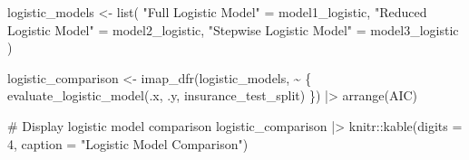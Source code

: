 \documentclass[
  11pt]{article}
\newenvironment{Shaded}{\begin{snugshade}}{\end{snugshade}}
\newcommand{\AttributeTok}[1]{\textcolor[rgb]{0.40,0.45,0.13}{#1}}
\newcommand{\CommentTok}[1]{\textcolor[rgb]{0.37,0.37,0.37}{#1}}
\newcommand{\DecValTok}[1]{\textcolor[rgb]{0.68,0.00,0.00}{#1}}
\newcommand{\FunctionTok}[1]{\textcolor[rgb]{0.28,0.35,0.67}{#1}}
\newcommand{\NormalTok}[1]{\textcolor[rgb]{0.00,0.23,0.31}{#1}}
\newcommand{\OtherTok}[1]{\textcolor[rgb]{0.00,0.23,0.31}{#1}}
\newcommand{\SpecialCharTok}[1]{\textcolor[rgb]{0.37,0.37,0.37}{#1}}
\newcommand{\StringTok}[1]{\textcolor[rgb]{0.13,0.47,0.30}{#1}}
\begin{document}
\begin{Shaded}
\begin{Highlighting}[]
\NormalTok{logistic\_models }\OtherTok{\textless{}{-}} \FunctionTok{list}\NormalTok{(}
    \StringTok{"Full Logistic Model"} \OtherTok{=}\NormalTok{ model1\_logistic,}
    \StringTok{"Reduced Logistic Model"} \OtherTok{=}\NormalTok{ model2\_logistic,}
    \StringTok{"Stepwise Logistic Model"} \OtherTok{=}\NormalTok{ model3\_logistic}
\NormalTok{)}

\NormalTok{logistic\_comparison }\OtherTok{\textless{}{-}} \FunctionTok{imap\_dfr}\NormalTok{(logistic\_models, }\SpecialCharTok{\textasciitilde{}}\NormalTok{ \{}
    \FunctionTok{evaluate\_logistic\_model}\NormalTok{(.x, .y, insurance\_test\_split)}
\NormalTok{\}) }\SpecialCharTok{|\textgreater{}} \FunctionTok{arrange}\NormalTok{(AIC)}

\CommentTok{\# Display logistic model comparison}
\NormalTok{logistic\_comparison }\SpecialCharTok{|\textgreater{}} 
\NormalTok{    knitr}\SpecialCharTok{::}\FunctionTok{kable}\NormalTok{(}\AttributeTok{digits =} \DecValTok{4}\NormalTok{, }\AttributeTok{caption =} \StringTok{"Logistic Model Comparison"}\NormalTok{)}
\end{Highlighting}
\end{Shaded}
\end{document}
